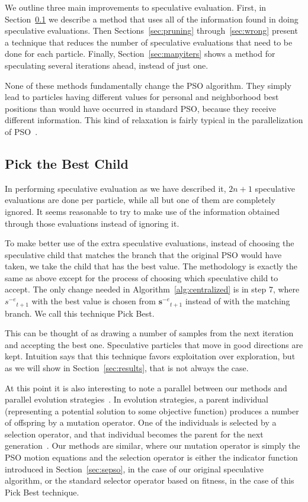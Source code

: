 \documentclass[smallcondensed]{svjour3}
\renewcommand{\sec}[1]{Section~\ref{sec:#1}}
\newcommand{\alg}[1]{Algorithm~\ref{alg:#1}}
\providecommand{\noeval}[1]{\ensuremath{#1^{-e}}}
\providecommand{\s}{\ensuremath{s}}
\providecommand{\sset}{\ensuremath{\mathbf{s}}}
\begin{document}
We outline three main improvements to speculative evaluation.  First, in
\sec{pickbest} we describe a method that uses all of the information found in
doing speculative evaluations.  Then Sections~\ref{sec:pruning}
through~\ref{sec:wrong} present a technique that reduces the number of
speculative evaluations that need to be done for each particle.  Finally,
\sec{manyiters} shows a method for speculating several iterations ahead,
instead of just one.

None of these methods fundamentally change the PSO algorithm.  They simply lead
to particles having different values for personal and neighborhood best
positions than would have occurred in standard PSO, because they receive
different information.  This kind of relaxation is fairly typical in the
parallelization of PSO~\citep{koh-2006-parallel-asynchronous-pso}.

\subsection{Pick the Best Child}
\label{sec:pickbest}

In performing speculative evaluation as we have described it, $2n+1$
speculative evaluations are done per particle, while all but one of them are
completely ignored.  It seems reasonable to try to make use of the information
obtained through those evaluations instead of ignoring it.

To make better use of the extra speculative evaluations, instead of choosing
the speculative child that matches the branch that the original PSO would have
taken, we take the child that has the best value.  The methodology is exactly
the same as above except for the process of choosing which speculative child to
accept.  The only change needed in \alg{centralized} is in step 7, where
$\noeval{\s}_{t+1}$ with the best value is chosen from $\noeval{\sset}_{t+1}$
instead of with the matching branch.  We call this technique Pick Best.

This can be thought of as drawing a number of samples from the next iteration
and accepting the best one.  Speculative particles that move in good directions
are kept.  Intuition says that this technique favors exploitation over
exploration, but as we will show in \sec{results}, that is not always the case.

At this point it is also interesting to note a parallel between our methods and
parallel evolution
strategies~\citep{rudolph-1991-distributed-evolution-strategies}.  In evolution
strategies, a parent individual (representing a potential solution to some
objective function) produces a number of offspring by a mutation operator.  One
of the individuals is selected by a selection operator, and that individual
becomes the parent for the next
generation~\citep{beyer-2002-evolution-strategies}.  Our methods are similar,
where our mutation operator is simply the PSO motion equations and the
selection operator is either the indicator function introduced in \sec{sepso},
in the case of our original speculative algorithm, or the standard selector
operator based on fitness, in the case of this Pick Best technique.
\end{document}
